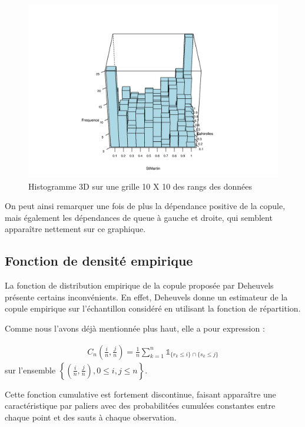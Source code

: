 \noindent%
\begin{figure}[H]
    \begin{center}
      \includegraphics[width=14 cm, angle=0]{./pictures/hist3d.png}
      \centering\caption{Histogramme 3D sur une grille 10 X 10 des rangs des données}
    \end{center}
\end{figure}

On peut ainsi remarquer une fois de plus la dépendance positive de la copule, mais également les dépendances de queue à gauche et droite, qui semblent apparaître nettement sur ce graphique.

\subsection{Fonction de densité empirique}

La fonction de distribution empirique de la copule proposée par Deheuvels présente certains inconvénients.
En effet, Deheuvels donne un estimateur de la copule empirique sur l'échantillon considéré en utilisant la 
fonction de répartition.

Comme nous l'avons déjà mentionnée plus haut, elle a pour expression :

\begin{eqnarray*}
C_n \left( \frac{i}{n},\frac{j}{n}\right) = \frac{1}{n} \sum_{k=1}^n \mathbb{1}_{ \{r_k \leq i\} \cap \{ s_k \leq j\} } 
\end{eqnarray*}
sur l'ensemble $\left \{ \left( \frac{i}{n} , \frac{j}{n} \right) , 0 \leq i,j \leq n   \right \}$.

Cette fonction cumulative est fortement discontinue, faisant apparaître une caractéristique par paliers avec des probabilitées cumulées constantes
entre chaque point et des sauts à chaque observation.

